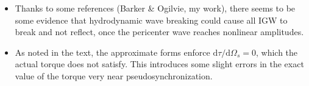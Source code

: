 \documentclass[
        fleqn,
        usenatbib,
        referee,
    ]{mnras}
\newcommand*{\rdil}[2]{\mathrm{d}#1 / \mathrm{d}#2}
\begin{document}
\begin{itemize}
    \item Thanks to some references (Barker \& Ogilvie, my work), there seems to
        be some evidence that hydrodynamic wave breaking could cause all IGW to
        break and not reflect, once the pericenter wave reaches nonlinear
        amplitudes.

    \item As noted in the text, the approximate forms enforce
        $\rdil{\tau}{\Omega_s} = 0$, which the actual torque does not satisfy.
        This introduces some slight errors in the exact value of the torque very
        near pseudosynchronization.
\end{itemize}






\bsp
\label{lastpage} %
\end{document}
